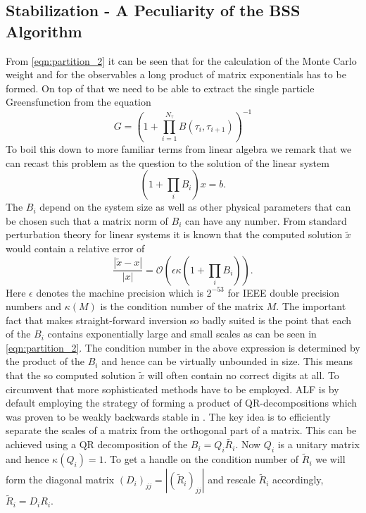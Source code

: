 \subsection{Stabilization - A Peculiarity of the BSS Algorithm}
From \eqref{eqn:partition_2} it can be seen that for the calculation of the Monte Carlo weight
and for the observables a long product of matrix exponentials has to be formed.
On top of that we need to be able to extract the single particle Greensfunction from 
the equation 
\begin{equation}
G = \left( 1 + \prod_{i = 1}^{N_\tau} B(\tau_i, \tau_{i+1})\right)^{-1}
\end{equation}
To boil this down to more familiar terms from linear algebra we remark that we can recast this problem as the question to the solution of the linear system
\begin{equation}
(1 + \prod_i B_i) x = b.
\end{equation}
The $B_i$ depend on the system size as well as other physical parameters that can be chosen such that a matrix norm of $B_i$ can have any number.
From standard perturbation theory for linear systems it is known that the computed solution $\tilde{x}$ would 
contain a relative error of
\begin{equation}
\frac{|\tilde{x} - x|}{|x|} = \mathcal{O}\left(\epsilon \kappa(1 + \prod_i B_i)\right).
\end{equation}
Here $\epsilon$ denotes the machine precision which is $2^{-53}$ for IEEE double precision numbers
and $\kappa(M)$ is the condition number of the matrix $M$.
The important fact that makes straight-forward inversion so badly suited is the point that
each of the $B_i$ contains exponentially large and small scales as can be seen in \eqref{eqn:partition_2}.
The condition number in the above expression is determined by the product of the $B_i$
and hence can be virtually unbounded in size. This means that the so computed solution $\tilde{x}$
will often contain no correct digits at all.
To circumvent that more sophisticated methods have to be employed. ALF is by default employing
the strategy of forming a product of QR-decompositions which was proven to be weakly backwards stable in \cite{Bai2011}.
The key idea is to efficiently separate the scales of a matrix from the orthogonal part of a matrix.
This can be achieved using a QR decomposition of the $B_i = Q_i \tilde{R_i}$. Now $Q_i$ is a unitary matrix and hence $\kappa(Q_i) = 1$.
To get a handle on the condition number of $\tilde{R}_i$ we will form the
diagonal matrix $(D_i)_{jj} = |(\tilde{R}_i)_{jj}|$ and rescale $\tilde{R}_i$ accordingly, $\tilde{R}_i = D_i R_i$.
